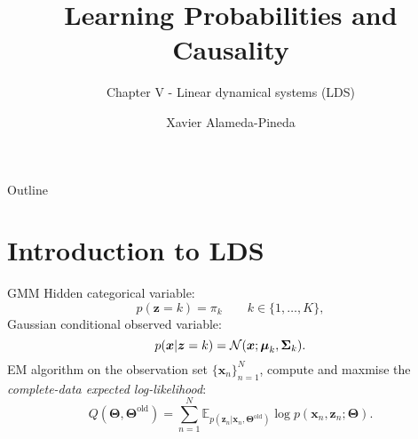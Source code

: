 \documentclass{beamer}
\title{Learning Probabilities and Causality}
\subtitle{Chapter V - Linear dynamical systems (LDS)} %
\author[Xavi]{Xavier Alameda-Pineda}
\institute{}
\date{}
\date{}
\newcommand{\bs}[1]{\boldsymbol{#1}}
\begin{document}
\begin{frame}
    \titlepage
    \vspace{-1.9cm}
\end{frame}

\begin{frame}{Outline}
 \tableofcontents
\end{frame}

%   
%   


\section{Introduction to LDS}

\begin{frame}{GMM}
 Hidden categorical variable:
 \begin{equation*} p(\bs{z}=k) = \pi_k \qquad k\in\{1,\ldots,K\},\end{equation*}
 Gaussian conditional observed variable:
 \begin{equation*} p(\bs{x}|\bs{z}=k) = {\cal N}(\bs{x};\bs{\mu}_k,\bs{\Sigma}_k).\end{equation*}
 EM algorithm on the observation set $\{\bs{x}_n\}_{n=1}^N$, compute and maxmise the \textit{complete-data expected log-likelihood}:
 \begin{equation*} Q(\bs{\Theta},\bs{\Theta}^{\textrm{old}}) =  \sum_{n=1}^N\mathbb{E}_{p(\bs{z}_n|\bs{x}_n,\bs{\Theta}^{\textrm{old}})} \log p(\bs{x}_n,\bs{z}_n;\bs{\Theta}).\end{equation*}
\end{frame}
\end{document}
